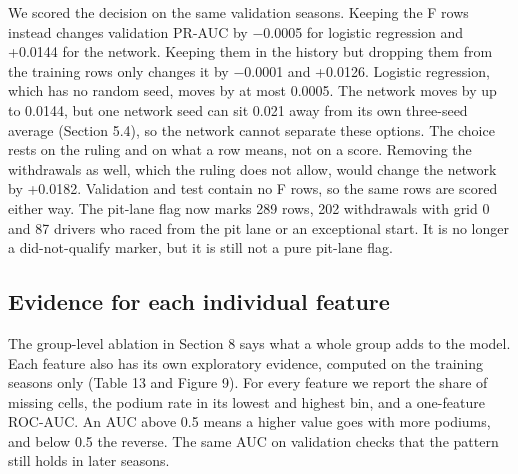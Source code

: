 \documentclass[10pt,a4paper]{article}
\begin{document}
We scored the decision on the same validation seasons. Keeping the F rows instead changes validation PR-AUC by $-$0.0005 for logistic regression and +0.0144 for the network. Keeping them in the history but dropping them from the training rows only changes it by $-$0.0001 and +0.0126. Logistic regression, which has no random seed, moves by at most 0.0005. The network moves by up to 0.0144, but one network seed can sit 0.021 away from its own three-seed average (Section 5.4), so the network cannot separate these options. The choice rests on the ruling and on what a row means, not on a score. Removing the withdrawals as well, which the ruling does not allow, would change the network by +0.0182. Validation and test contain no F rows, so the same rows are scored either way. The pit-lane flag now marks 289 rows, 202 withdrawals with grid 0 and 87 drivers who raced from the pit lane or an exceptional start. It is no longer a did-not-qualify marker, but it is still not a pure pit-lane flag.



\subsection{Evidence for each individual feature}


The group-level ablation in Section 8 says what a whole group adds to the model. Each feature also has its own exploratory evidence, computed on the training seasons only (Table 13 and Figure 9). For every feature we report the share of missing cells, the podium rate in its lowest and highest bin, and a one-feature ROC-AUC. An AUC above 0.5 means a higher value goes with more podiums, and below 0.5 the reverse. The same AUC on validation checks that the pattern still holds in later seasons.
\end{document}

